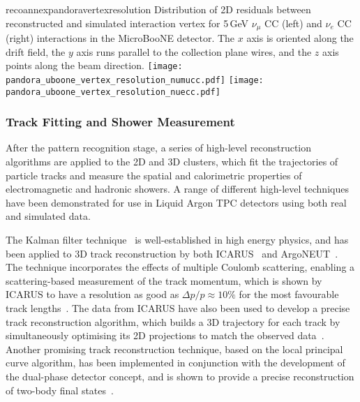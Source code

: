 \begin{cdrfigure}{recoannexpandoravertexresolution}
{Distribution of 2D residuals between reconstructed and simulated interaction
 vertex for 5\,GeV $\nu_{\mu}$ CC (left) and $\nu_{e}$ CC (right) interactions in the MicroBooNE detector.
 The $x$ axis is oriented along the drift field, the $y$ axis runs parallel 
 to the collection plane wires, and the $z$ axis points along the beam direction.}
\texttt{[image: pandora\_uboone\_vertex\_resolution\_numucc.pdf]}
\texttt{[image: pandora\_uboone\_vertex\_resolution\_nuecc.pdf]}
\end{cdrfigure}

\subsubsection{Track Fitting and Shower Measurement}


After the pattern recognition stage, a series of high-level reconstruction
algorithms are applied to the 2D and 3D clusters,
which fit the trajectories of particle tracks and measure the
spatial and calorimetric properties of electromagnetic and hadronic showers.
A range of different high-level techniques have been demonstrated 
for use in Liquid Argon TPC detectors using both real and simulated data.

The Kalman filter technique~\cite{kalman} is well-established in high energy physics,
and has been applied to 3D track reconstruction by both ICARUS~\cite{Ankowski:2006ts} and ArgoNEUT~\cite{REF}.
The technique incorporates the effects of multiple Coulomb scattering,
enabling a scattering-based measurement of the track momentum,
which is shown by ICARUS to have a resolution as good as $\Delta p/p \approx 10\%$ 
for the most favourable track lengths~\cite{Ankowski:2006ts}.
The data from ICARUS have also been used to develop a precise
track reconstruction algorithm, which builds a 3D trajectory for each track by simultaneously
optimising its 2D projections to match the observed data~\cite{Antonello:2012hu}.
Another promising track reconstruction technique, based on the local principal curve algorithm,
has been implemented in conjunction with the development of the 
dual-phase detector concept, and is shown to provide 
a precise reconstruction of two-body final states~\cite{Back:2013cva,LAGUNA-LBNO-deliv}. 

